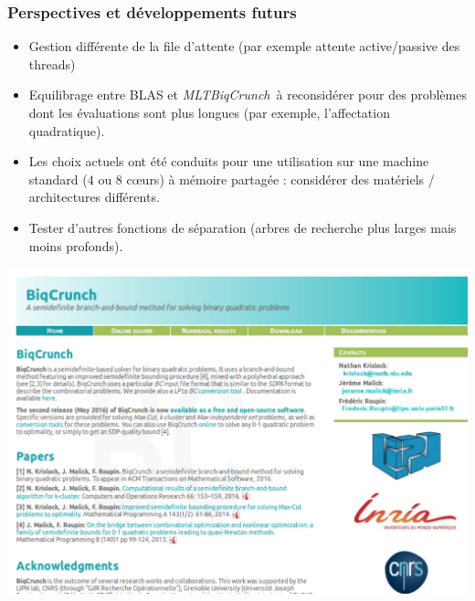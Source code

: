 \documentclass{beamer}
\def\bleu#1{{\color{blue}#1}}
\newcommand{\mltbiqcrunch}{\emph{\mbox{MLTBiqCrunch}}}
\begin{document}
%
%
%
%
%

\begin{frame}
\frametitle{Perspectives et développements futurs}

\begin{itemize}

\item Gestion différente de la file d'attente (par exemple attente active/passive des threads)
\item \bleu{Equilibrage} entre BLAS et \mltbiqcrunch ~à reconsidérer pour des problèmes dont les \bleu{évaluations sont plus longues} (par exemple, l'affectation quadratique).
\item Les choix actuels ont été conduits pour une utilisation sur une \bleu{machine standard} ($4$ ou $8$ c\oe urs) à mémoire partagée : considérer des matériels / architectures \bleu{différents}.
\item Tester d'\bleu{autres fonctions de séparation} (arbres de recherche plus larges mais moins profonds).

\end{itemize}

\end{frame}

\begin{frame}
\includegraphics[scale=0.44]{fig/BiqHome.pdf}

\end{frame}
\end{document}
